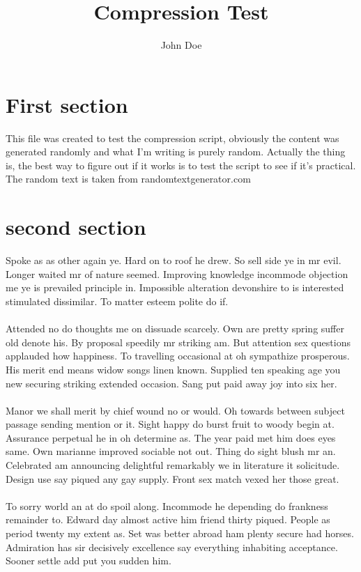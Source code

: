 \documentclass[fontsize=12pt, paper=letter]{article}
\title{Compression Test}
\author{John Doe}
\begin{document}
	\maketitle
	\section {First section}
This file was created to test the compression script, obviously the content was generated randomly and what I'm writing is purely random. Actually the thing is, the best way to figure out if it works is to test the script to see if it's practical. The random text is taken from randomtextgenerator.com
\section {second section}
	Spoke as as other again ye. Hard on to roof he drew. So sell side ye in mr evil. Longer waited mr of nature seemed. Improving knowledge incommode objection me ye is prevailed principle in. Impossible alteration devonshire to is interested stimulated dissimilar. To matter esteem polite do if.\\\\
Attended no do thoughts me on dissuade scarcely. Own are pretty spring suffer old denote his. By proposal speedily mr striking am. But attention sex questions applauded how happiness. To travelling occasional at oh sympathize prosperous. His merit end means widow songs linen known. Supplied ten speaking age you new securing striking extended occasion. Sang put paid away joy into six her.\\\\
Manor we shall merit by chief wound no or would. Oh towards between subject passage sending mention or it. Sight happy do burst fruit to woody begin at. Assurance perpetual he in oh determine as. The year paid met him does eyes same. Own marianne improved sociable not out. Thing do sight blush mr an. Celebrated am announcing delightful remarkably we in literature it solicitude. Design use say piqued any gay supply. Front sex match vexed her those great.\\\\
To sorry world an at do spoil along. Incommode he depending do frankness remainder to. Edward day almost active him friend thirty piqued. People as period twenty my extent as. Set was better abroad ham plenty secure had horses. Admiration has sir decisively excellence say everything inhabiting acceptance. Sooner settle add put you sudden him.\\\\
\end{document}
